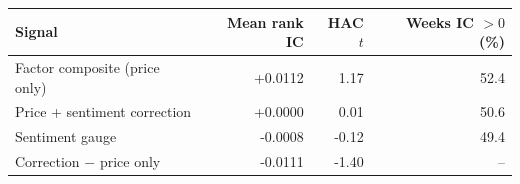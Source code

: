 \begin{tabular}{lrrr}
\toprule
Signal & Mean rank IC & HAC $t$ & Weeks IC $>0$ (\%) \\
\midrule
Factor composite (price only) & +0.0112 & 1.17 & 52.4 \\
Price + sentiment correction & +0.0000 & 0.01 & 50.6 \\
Sentiment gauge & -0.0008 & -0.12 & 49.4 \\
Correction $-$ price only & -0.0111 & -1.40 & -- \\
\bottomrule
\end{tabular}
